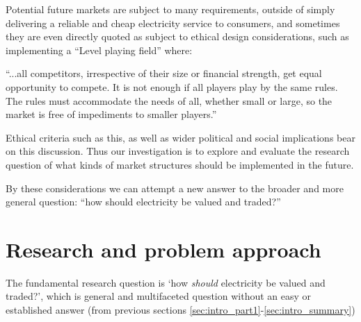 Potential future markets are subject to many requirements, outside of simply delivering a reliable and cheap electricity service to consumers, and sometimes they are even directly quoted as subject to ethical design considerations, such as implementing a ``Level playing field'' where:

\begin{displayquote}
``...all competitors, irrespective of their size or financial strength, get equal opportunity to compete. It is not enough if all players play by the same rules. The rules must accommodate the needs of all, whether small or large, so the market is free of impediments to smaller players.''
\\\citep{australianenergymarketoperatorlimited2018}
\end{displayquote}

Ethical criteria such as this, as well as wider political and social implications bear on this discussion. 
Thus our investigation is to explore and evaluate the research question of what kinds of market structures should be implemented in the future.


\noindent By these considerations we can attempt a new answer to the broader and more general question: ``how should electricity be valued and traded?''


\section{Research and problem approach}

The fundamental research question is `how \textit{should} electricity be valued and traded?', which is general and multifaceted question without an easy or established answer (from previous sections \ref{sec:intro_part1}-\ref{sec:intro_summary})


